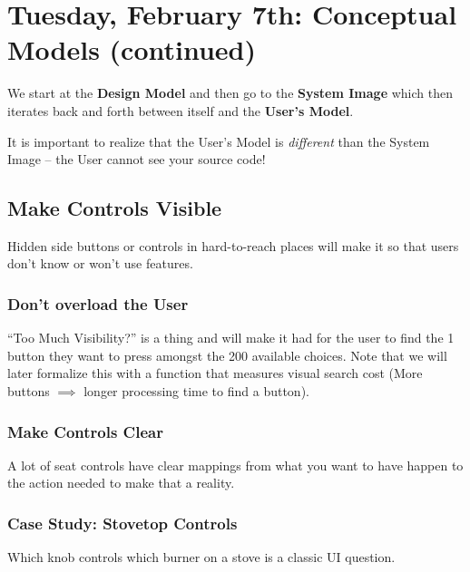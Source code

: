 \section{Tuesday, February 7th: Conceptual Models (continued)}
We start at the \textbf{Design Model} and then go to the \textbf{System Image} which then iterates back and forth between itself and the \textbf{User's Model}.

It is important to realize that the User's Model is \textit{different} than the System Image -- the User cannot see your source code!

\subsection{Make Controls Visible}
Hidden side buttons or controls in hard-to-reach places will make it so that users don't know or won't use features.

\subsubsection{Don't overload the User}
``Too Much Visibility?'' is a thing and will make it had for the user to find the 1 button they want to press amongst the 200 available choices. Note that we will later formalize this with a function that measures visual search cost (More buttons $\implies$ longer processing time to find a button).

\subsubsection{Make Controls Clear}
A lot of seat controls have clear mappings from what you want to have happen to the action needed to make that a reality.

\subsubsection{Case Study: Stovetop Controls}
Which knob controls which burner on a stove is a classic UI question.

